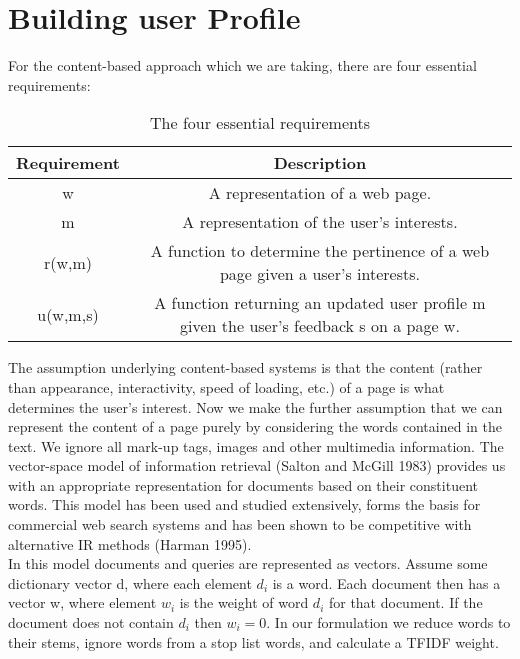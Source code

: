 \section{Building user Profile}
For the content-based approach which we are taking, there are four essential requirements:
\begin{table}[ht]
\caption{The four essential requirements} %
\centering  %
\begin{tabular}{c c} %
\hline\hline                        %
Requirement & Description\\ [0.5ex] %
\hline                  %
w & A representation of a web page. \\ %
m & A representation of the user's interests.\\
r(w,m)& A function to determine the pertinence of a web page given a user's interests.\\
u(w,m,s)& A function returning an updated user profile m given the user's feedback s on a page w. \\[1ex]      %
\hline %
\end{tabular}
\label{table:2} %
\end{table}
The assumption underlying content-based systems is that the content (rather than appearance, interactivity, speed of loading, etc.) of a page is what determines the user's interest. Now we make the further assumption that we can represent the content of a page purely by considering the words contained in the text. We ignore all mark-up tags, images and other multimedia information.
The vector-space model of information retrieval (Salton and McGill 1983) provides us with an appropriate representation for documents based on their constituent words. This model has been used and studied extensively, forms the basis for commercial web search systems and has been shown to be competitive with alternative IR methods (Harman 1995).\\
In this model documents and queries are represented as vectors. Assume some dictionary vector d, where each element $d_i$ is a word. Each document then has a vector w, where element $w_i$ is the weight of word $d_i$ for that document. If the document does not contain $d_i$ then $w_i = 0$.
In our formulation we reduce words to their stems, ignore words from a stop list words, and calculate a TFIDF weight.\\
